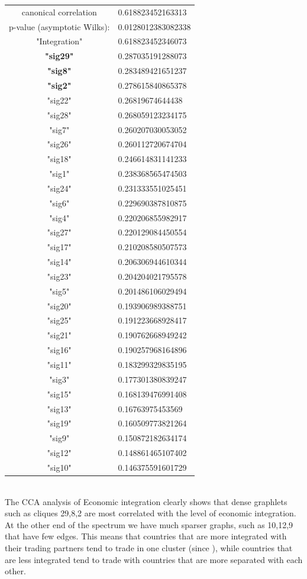 \documentclass[11pt,a4paper,oneside]{report}
\begin{document}
\begin{tabular}{ c | l }
canonical correlation &  0.618823452163313\\
p-value (asymptotic Wilks): & 0.0128012383082338\\
\hline
"Integration" & 0.618823452346073\\
\hline
\textbf{"sig29"} & 0.287035191288073\\
\textbf{"sig8"} & 0.283489421651237\\
\textbf{"sig2"} & 0.278615840865378\\
"sig22" & 0.26819674644438\\
"sig28" & 0.268059123234175\\
"sig7" & 0.260207030053052\\
"sig26" & 0.260112720674704\\
"sig18" & 0.246614831141233\\
"sig1" & 0.238368565474503\\
"sig24" & 0.231333551025451\\
"sig6" & 0.229690387810875\\
"sig4" & 0.220206855982917\\
"sig27" & 0.220129084450554\\
"sig17" & 0.210208580507573\\
"sig14" & 0.206306944610344\\
"sig23" & 0.204204021795578\\
"sig5" & 0.201486106029494\\
"sig20" & 0.193906989388751\\
"sig25" & 0.191223668928417\\
"sig21" & 0.190762668949242\\
"sig16" & 0.190257968164896\\
"sig11" & 0.183299329835195\\
"sig3"& 0.177301380839247\\
"sig15"& 0.168139476991408\\
"sig13"& 0.16763975453569\\
"sig19"& 0.160509773821264\\
"sig9" &0.150872182634174\\
"sig12"& 0.148861465107402\\
"sig10"& 0.146375591601729\\
\end{tabular}\\

The CCA analysis of Economic integration clearly shows that dense graphlets such as cliques {29,8,2} are most correlated with the level of economic integration. At the other end of the spectrum we have much sparser graphs, such as {10,12,9} that have few edges. This means that countries that are more integrated with their trading partners tend to trade in one cluster (since ), while countries that are less integrated tend to trade with countries that are more separated with each other. 
\end{document}
